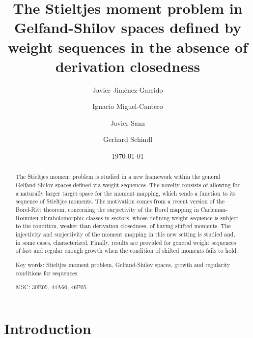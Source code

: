 \documentclass[12pt,a4paper]{article}
\theoremstyle{plain}
\theoremstyle{definition}
\numberwithin{equation}{section}
\begin{document}
\title{The Stieltjes moment problem in Gelfand-Shilov spaces defined by weight sequences in the absence of derivation closedness}


\author{Javier Jim\'enez-Garrido \and Ignacio Miguel-Cantero \and Javier Sanz \and Gerhard Schindl}
\date{\today}

\maketitle

\begin{abstract}

The Stieltjes moment problem is studied in a new framework within the general Gelfand-Shilov spaces defined via weight sequences. The novelty consists of allowing for a naturally larger target space for the moment mapping, which sends a function to its sequence of Stieltjes moments. The motivation comes from a recent version of the Borel-Ritt theorem, concerning the surjectivity of the Borel mapping in Carleman-Roumieu ultraholomorphic classes in sectors, whose defining weight sequence is subject to the condition, weaker than derivation closedness, of having shifted moments. The injectivity and surjectivity of the moment mapping in this new setting is studied and, in some cases, characterized. Finally, results are provided for general weight sequences of fast and regular enough growth when the condition of shifted moments fails to hold.
\par\medskip

\noindent Key words: Stieltjes moment problem, Gelfand-Shilov spaces, growth and regularity conditions for sequences.\par
\medskip
{} MSC: 30E05, 44A60, 46F05.
\end{abstract}



\section{Introduction}\label{intro}
\end{document}
